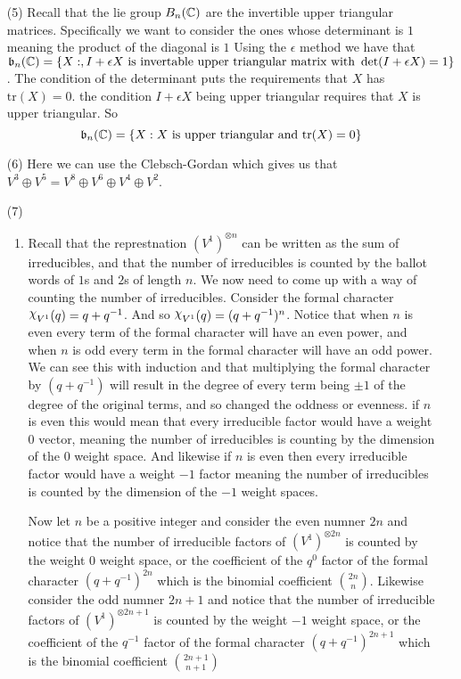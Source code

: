 \documentclass[12pt]{amsart}
\begin{document}
\begin{itemize}
     \item[(5)] Recall that the lie group $B_n(\mathbb{C})$ are the invertible upper 
     triangular matrices. Specifically we want to consider the ones whose determinant is $1$ meaning the product of 
     the diagonal is $1$
     Using the $\epsilon$ method we have that 
     $\mathfrak{b}_n(\mathbb{C})=\{X:, I+\epsilon X\text{ is invertable upper triangular matrix with }\det(I+\epsilon X)=1\}$.
     The condition of the determinant puts the requirements that $X$ has $\text{tr}(X)=0$.
     the condition $I+\epsilon X$ being upper triangular requires that $X$ is upper triangular. 
     So \[\mathfrak{b}_n(\mathbb{C})=\{X: X\text{ is upper triangular and }\text{tr}(X)=0\}\]

     \item[(6)] Here we can use the Clebsch-Gordan which gives us that $V^3\oplus V^5=V^{8}\oplus V^{6}\oplus V^{4}\oplus V^{2}$.\\
     

     \item[(7)] 
     \begin{enumerate}[label= (\alph*)]
      \item Recall that the represtnation $(V^1)^{\otimes n}$ can be written as the sum of irreducibles, and 
      that the number of irreducibles is counted by the ballot words of $1$s and $2$s of length $n$. 
      We now need to come up with a way of counting the number of irreducibles. Consider the formal character 
      $\rchi_{V^1}(q)=q+q^{-1}$. And so $\rchi_{V^1}(q)=(q+q^{-1})^n$. 
      Notice that when $n$ is even every term of the formal character will have an even power, and when $n$ is odd every 
      term in the formal character will have an odd power. We can see this with induction and that multiplying the 
      formal character by $(q+q^{-1})$ will result in the degree of every term being $\pm 1$ of the degree of the 
      original terms, and so changed the oddness or evenness. if $n$ is even this would mean that every irreducible factor 
      would have a weight $0$ vector, meaning the number of irreducibles is counting by the dimension of the $0$ weight space.
      And likewise if $n$ is even then every irreducible factor would have a weight $-1$ factor meaning the number of irreducibles 
      is counted by the dimension of the $-1$ weight spaces.

      Now let $n$ be a positive integer and consider the even numner $2n$ and notice that the number of irreducible 
      factors of $(V^1)^{\otimes 2n}$ is counted by the weight $0$ weight space, or the coefficient of the $q^0$ factor 
      of the formal character $(q+q^{-1})^{2n}$ which is the binomial coefficient ${2n \choose n}$. Likewise consider 
      the odd numner $2n+1$ and notice that the number of irreducible 
      factors of $(V^1)^{\otimes 2n+1}$ is counted by the weight $-1$ weight space, or the coefficient of the $q^{-1}$ factor 
      of the formal character $(q+q^{-1})^{2n+1}$ which is the binomial coefficient ${2n+1 \choose n+1}$



\end{enumerate}
\end{itemize}
\end{document}
